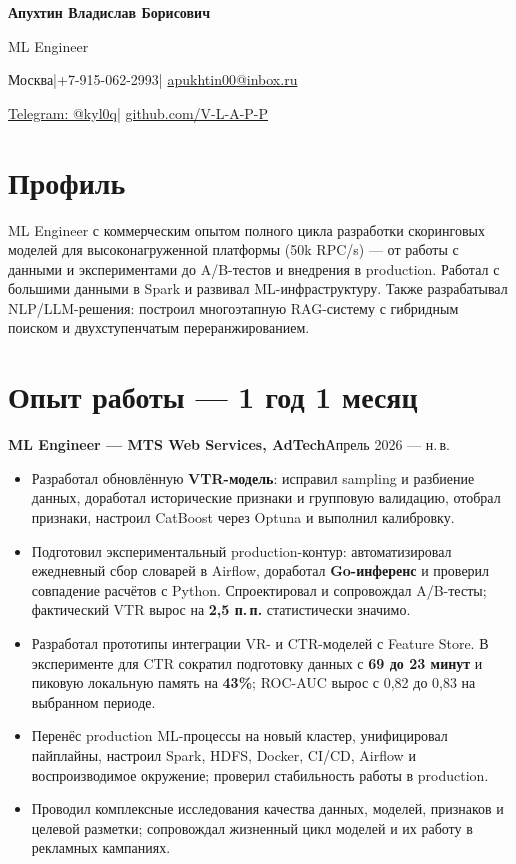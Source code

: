 \documentclass[10pt,a4paper]{article}
\begin{document}
\begingroup\centering
{\LARGE\bfseries Апухтин Владислав Борисович}\par
\vspace{2pt}
{\large ML Engineer}\par
\vspace{3pt}
{\small Москва\enspace|\enspace +7-915-062-2993\enspace|\enspace
\href{mailto:apukhtin00@inbox.ru}{apukhtin00@inbox.ru}\par
\href{https://t.me/kyl0q}{Telegram: @kyl0q}\enspace|\enspace
\href{https://github.com/V-L-A-P-P}{github.com/V-L-A-P-P}}
\par\endgroup

\section*{Профиль}
ML Engineer с коммерческим опытом полного цикла разработки скоринговых моделей для высоконагруженной платформы (50k RPC/s) — от работы с данными и экспериментами до A/B-тестов и внедрения в production. Работал с большими данными в Spark и развивал ML-инфраструктуру. Также разрабатывал NLP/LLM-решения: построил многоэтапную RAG-систему с гибридным поиском и двухступенчатым переранжированием.

\section{Опыт работы — 1 год 1 месяц}
\textbf{ML Engineer — MTS Web Services, AdTech}\hfill Апрель 2026 — н.\,в.\par
\begin{itemize}[itemsep=2pt]
\item Разработал обновлённую \textbf{VTR-модель}: исправил sampling и разбиение данных, доработал исторические признаки и групповую валидацию, отобрал признаки, настроил CatBoost через Optuna и выполнил калибровку.
\item Подготовил экспериментальный production-контур: автоматизировал ежедневный сбор словарей в Airflow, доработал \textbf{Go-инференс} и проверил совпадение расчётов с Python. Спроектировал и сопровождал A/B-тесты; фактический VTR вырос на \textbf{2,5 п.\,п.} статистически значимо.
\item Разработал прототипы интеграции VR- и CTR-моделей с Feature Store. В эксперименте для CTR сократил подготовку данных с \textbf{69 до 23 минут} и пиковую локальную память на \textbf{43\%}; ROC-AUC вырос с 0,82 до 0,83 на выбранном периоде.
\item Перенёс production ML-процессы на новый кластер, унифицировал пайплайны, настроил Spark, HDFS, Docker, CI/CD, Airflow и воспроизводимое окружение; проверил стабильность работы в production.
\item Проводил комплексные исследования качества данных, моделей, признаков и целевой разметки; сопровождал жизненный цикл моделей и их работу в рекламных кампаниях.
\end{itemize}
\end{document}
